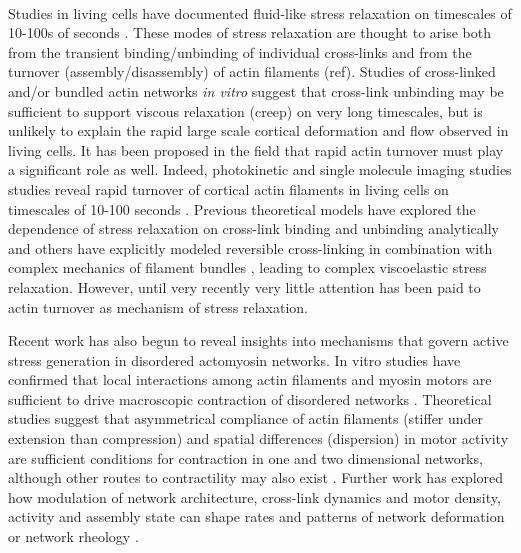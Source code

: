 \paragraph{} Studies in living cells have documented fluid-like stress relaxation on timescales of 10-100s of seconds \cite{cellmech_flows,cellmech_flows2,cellmech_flows3,rheo_fluid,rheo_fluid2,cell_rheo_exp}.  These modes of stress relaxation are thought to arise both from the transient binding/unbinding of individual cross-links and from the turnover (assembly/disassembly) of actin filaments (ref).  Studies of cross-linked and/or bundled actin networks {\em in vitro} suggest that cross-link unbinding may be sufficient to support viscous relaxation (creep) on very long timescales\cite{rheo_crosslinksmatter,rheo_crosslinkslip1,rheo_crosslinkslip2,rheo_crosslinkslip3,rheo_nonaffine}, but is unlikely to explain the rapid large scale cortical deformation and flow observed in living cells.  It has been proposed in the field that rapid actin turnover must play a significant role as well. Indeed, photokinetic and single molecule imaging studies studies reveal rapid turnover of cortical actin filaments in living cells on timescales of 10-100 seconds \cite{Robin:2014aa}. Previous theoretical models have explored  the dependence of stress relaxation on cross-link binding and unbinding analytically \cite{theo_crosslinkslip1,theo_crosslinkslip2} and others have explicitly modeled reversible cross-linking in combination with complex mechanics of filament bundles \cite{model_taeyoon,rheo_crosslinkslip2,theo_crosslinkslip3}, leading to complex viscoelastic stress relaxation.  However, until very recently \cite{Mak:2016aa} very little attention has been paid to actin turnover as mechanism of stress relaxation. 

Recent work has also begun to reveal insights into mechanisms that govern active stress generation in disordered actomyosin networks. In vitro studies have confirmed that local interactions among actin filaments and myosin motors are sufficient to drive macroscopic contraction of disordered networks \cite{rheo_2D1}.  Theoretical studies suggest that asymmetrical compliance of actin filaments (stiffer under extension than compression) and spatial differences (dispersion) in motor activity are sufficient conditions for contraction in one \cite{1367-2630-14-3-033037} and two \cite{PhysRevX.4.041002} dimensional networks, although other routes to contractility may also exist \cite{PhysRevX.4.041002}.  Further work has explored how modulation of network architecture, cross-link dynamics and motor density, activity and assembly state can shape rates and patterns of network deformation \cite{10.1371/journal.pone.0039869,Alvarado:2013aa,C0SM00494D} or network rheology \cite{0295-5075-85-1-18007,rheo_active}.  

